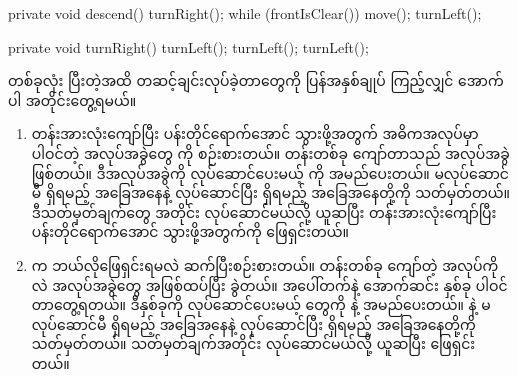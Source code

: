 \begin{sloppypar}
\begin{lstcodelong}[{\mycodelstcpt{HurdleJumping}}, label={lst:HurdleJumpingAscDscImpl}]
{        private void descend() {
                turnRight();
                while (frontIsClear()) {
                        move();
                }
                turnLeft();
        }

        private void turnRight() {
                turnLeft();
                turnLeft();
                turnLeft();
        }
}
\end{lstcodelong}

%        

 \mmprogram တစ်ခုလုံး ပြီးတဲ့အထိ တဆင့်ချင်းလုပ်ခဲ့တာတွေကို ပြန်အနှစ်ချုပ် ကြည့်လျှင် အောက်ပါ   အတိုင်းတွေ့ရမယ်။ 

\begin{enumerate}
  \item တန်းအားလုံးကျော်ပြီး ပန်းတိုင်ရောက်အောင် သွားဖို့အတွက် အဓိကအလုပ်မှာ ပါဝင်တဲ့ အလုပ်အခွဲတွေ ကို စဉ်းစားတယ်။ တန်းတစ်ခု ကျော်တာသည် အလုပ်အခွဲ  ဖြစ်တယ်။  ဒီအလုပ်အခွဲကို လုပ်ဆောင်ပေးမယ့် \mmcommand ကို  အမည်ပေးတယ်။  မလုပ်ဆောင်မီ ရှိရမည့် အခြေအနေနဲ့ လုပ်ဆောင်ပြီး ရှိရမည့် အခြေအနေတို့ကို သတ်မှတ်တယ်။ ဒီသတ်မှတ်ချက်တွေ အတိုင်း လုပ်ဆောင်မယ်လို့ ယူဆပြီး တန်းအားလုံးကျော်ပြီး ပန်းတိုင်ရောက်အောင် သွားဖို့အတွက်ကို ဖြေရှင်းတယ်။     \label{itm:HurdleJumpingMain}
  
  \item {} က ဘယ်လိုဖြေရှင်းရမလဲ ဆက်ပြီးစဉ်းစားတယ်။ တန်းတစ်ခု ကျော်တဲ့ အလုပ်ကိုလဲ အလုပ်အခွဲတွေ အဖြစ်ထပ်ပြီး ခွဲတယ်။ အပေါ်တက်နဲ့ အောက်ဆင်း နှစ်ခု ပါဝင်တာတွေ့ရတယ်။ ဒီနှစ်ခုကို လုပ်ဆောင်ပေးမယ့် \mmcommand တွေကို  နဲ့  အမည်ပေးတယ်။  နဲ့  မလုပ်ဆောင်မီ ရှိရမည့် အခြေအနေနဲ့ လုပ်ဆောင်ပြီး ရှိရမည့် အခြေအနေတို့ကို သတ်မှတ်တယ်။ သတ်မှတ်ချက်အတိုင်း လုပ်ဆောင်မယ်လို့ ယူဆပြီး  ဖြေရှင်းတယ်။     \label{itm:HurdleJumpingSub}


\end{enumerate}
\end{sloppypar}
